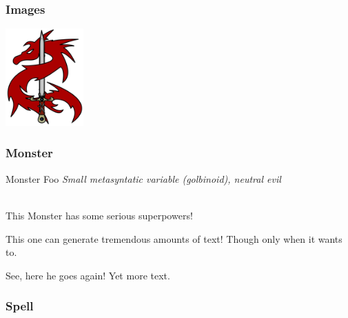 \documentclass[10pt,twoside,twocolumn]{article}
\begin{document}
\subsubsection{Images}

\begin{center}
\includegraphics[width=3cm]{img/Fantasy_icon.png}\par
\end{center}

\subsubsection{Monster}

\begin{monsterbox}{Monster Foo}
    \textit{Small metasyntatic variable (golbinoid), neutral evil}\\
    \hline
    \basics[%
    armorclass = 12,
    hitpoints  = 16 (3d8 + 3),
    speed      = 50 ft
    ]
    \hline
    \stats[
    STR = 12 (+1),
    DEX = 14 (+2)
    ]
    \hline
    \details[%
    languages = {Common Lisp, Erlang},
    ]
    \hline \\[1mm]
    \begin{monsteraction}
        This Monster has some serious superpowers!
    \end{monsteraction}
    \begin{monsteraction}
        This one can generate tremendous amounts of text! Though only when it wants to.
    \end{monsteraction}

    \begin{monsteraction}
    See, here he goes again! Yet more text.
    \end{monsteraction}
\end{monsterbox}

\subsubsection{Spell}
\end{document}
